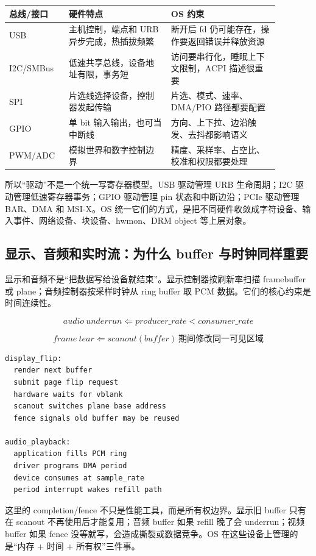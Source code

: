\begin{longtable}{p{0.18\linewidth}p{0.34\linewidth}p{0.36\linewidth}}
\toprule
总线/接口 & 硬件特点 & OS 约束 \\
\midrule
USB & 主机控制，端点和 URB 异步完成，热插拔频繁 & 断开后 fd 仍可能存在，操作要返回错误并释放资源 \\
I2C/SMBus & 低速共享总线，设备地址有限，事务短 & 访问要串行化，睡眠上下文限制，ACPI 描述很重要 \\
SPI & 片选线选择设备，控制器发起传输 & 片选、模式、速率、DMA/PIO 路径都要配置 \\
GPIO & 单 bit 输入输出，也可当中断线 & 方向、上下拉、边沿触发、去抖都影响语义 \\
PWM/ADC & 模拟世界和数字控制边界 & 精度、采样率、占空比、校准和权限都要处理 \\
\bottomrule
\end{longtable}

所以“驱动”不是一个统一写寄存器模型。USB 驱动管理 URB 生命周期；I2C 驱动管理低速寄存器事务；GPIO 驱动管理 pin 状态和中断边沿；PCIe 驱动管理 BAR、DMA 和 MSI-X。OS 统一它们的方式，是把不同硬件收敛成字符设备、输入事件、网络设备、块设备、hwmon、DRM object 等上层对象。

\subsection{显示、音频和实时流：为什么 buffer 与时钟同样重要}

显示和音频不是“把数据写给设备就结束”。显示控制器按刷新率扫描 framebuffer 或 plane；音频控制器按采样时钟从 ring buffer 取 PCM 数据。它们的核心约束是时间连续性。

\[
audio\ underrun \Leftarrow producer\_rate < consumer\_rate
\]

\[
frame\ tear \Leftarrow scanout(buffer)\ \text{期间修改同一可见区域}
\]

\begin{lstlisting}
display_flip:
  render next buffer
  submit page flip request
  hardware waits for vblank
  scanout switches plane base address
  fence signals old buffer may be reused

audio_playback:
  application fills PCM ring
  driver programs DMA period
  device consumes at sample_rate
  period interrupt wakes refill path
\end{lstlisting}

这里的 completion/fence 不只是性能工具，而是所有权边界。显示旧 buffer 只有在 scanout 不再使用后才能复用；音频 buffer 如果 refill 晚了会 underrun；视频 buffer 如果 fence 没等就写，会造成撕裂或数据竞争。OS 在这些设备上管理的是“内存 + 时间 + 所有权”三件事。

